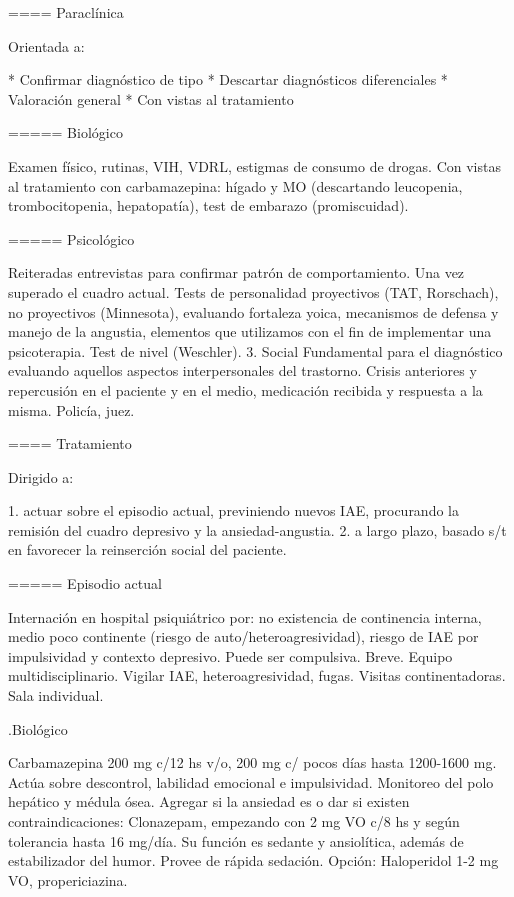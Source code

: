==== Paraclínica

Orientada a:

* Confirmar diagnóstico de tipo
* Descartar diagnósticos diferenciales
* Valoración general
* Con vistas al tratamiento

===== Biológico

Examen físico, rutinas, VIH, VDRL, estigmas de consumo de drogas. Con vistas al tratamiento con carbamazepina: hígado y MO (descartando leucopenia, trombocitopenia, hepatopatía), test de embarazo (promiscuidad).

===== Psicológico

Reiteradas entrevistas para confirmar patrón de comportamiento. Una vez superado el cuadro actual. Tests de personalidad proyectivos (TAT, Rorschach), no proyectivos (Minnesota), evaluando fortaleza yoica, mecanismos de defensa y manejo de la angustia, elementos que utilizamos con el fin de implementar una psicoterapia. Test de nivel (Weschler). 3. Social Fundamental para el diagnóstico evaluando aquellos aspectos interpersonales del trastorno. Crisis anteriores y repercusión en el paciente y en el medio, medicación recibida y respuesta a la misma. Policía, juez.

==== Tratamiento

Dirigido a:

1. actuar sobre el episodio actual, previniendo nuevos IAE, procurando la remisión del cuadro depresivo y la ansiedad-angustia.
2. a largo plazo, basado s/t en favorecer la reinserción social del paciente.

===== Episodio actual

Internación en hospital psiquiátrico por: no existencia de continencia interna, medio poco continente (riesgo de auto/heteroagresividad), riesgo de IAE por impulsividad y contexto depresivo. Puede ser compulsiva. Breve. Equipo multidisciplinario. Vigilar IAE, heteroagresividad, fugas. Visitas continentadoras. Sala individual.

.Biológico

Carbamazepina 200 mg c/12 hs v/o, 200 mg c/ pocos días hasta 1200-1600 mg. Actúa sobre descontrol, labilidad emocional e impulsividad. Monitoreo del polo hepático y médula ósea. Agregar si la ansiedad es o dar si existen contraindicaciones: Clonazepam, empezando con 2 mg VO c/8 hs y según tolerancia hasta 16 mg/día. Su función es sedante y ansiolítica, además de estabilizador del humor. Provee de rápida sedación. Opción: Haloperidol 1-2 mg VO, propericiazina.

